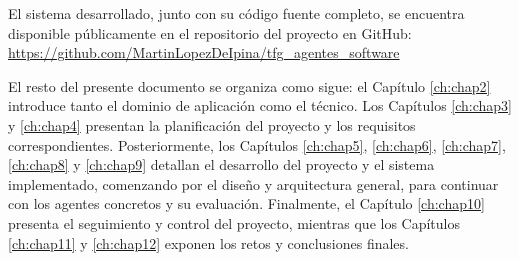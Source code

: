 El sistema desarrollado, junto con su código fuente completo, se encuentra disponible públicamente en el repositorio del proyecto en GitHub: \url{https://github.com/MartinLopezDeIpina/tfg\_agentes\_software}

El resto del presente documento se organiza como sigue: el Capítulo \ref{ch:chap2} introduce tanto el dominio de aplicación como el técnico. Los Capítulos \ref{ch:chap3} y \ref{ch:chap4} presentan la planificación del proyecto y los requisitos correspondientes. Posteriormente, los Capítulos \ref{ch:chap5}, \ref{ch:chap6}, \ref{ch:chap7}, \ref{ch:chap8} y \ref{ch:chap9} detallan el desarrollo del proyecto y el sistema implementado, comenzando por el diseño y arquitectura general, para continuar con los agentes concretos y su evaluación. Finalmente, el Capítulo \ref{ch:chap10} presenta el seguimiento y control del proyecto, mientras que los Capítulos \ref{ch:chap11} y \ref{ch:chap12} exponen los retos y conclusiones finales.
